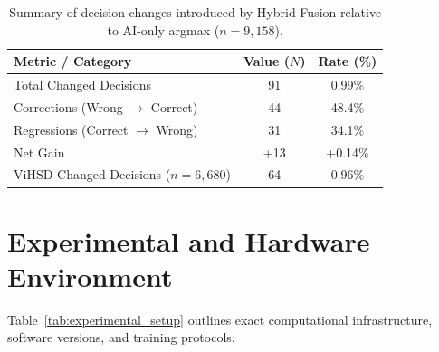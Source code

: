 \documentclass[runningheads]{llncs}
\begin{document}
\begin{table}[H]
\centering
\caption{Summary of decision changes introduced by Hybrid Fusion relative to AI-only argmax ($n=9{,}158$).}
\label{tab:change_analysis_full}
\begin{tabular}{lcc}
\toprule
Metric / Category & Value ($N$) & Rate (\%) \\
\midrule
Total Changed Decisions & 91 & 0.99\% \\
Corrections (Wrong $\to$ Correct) & 44 & 48.4\% \\
Regressions (Correct $\to$ Wrong) & 31 & 34.1\% \\
Net Gain & +13 & +0.14\% \\
\midrule
ViHSD Changed Decisions ($n=6{,}680$) & 64 & 0.96\% \\
\bottomrule
\end{tabular}
\end{table}

\section{Experimental and Hardware Environment}
Table~\ref{tab:experimental_setup} outlines exact computational infrastructure, software versions, and training protocols.

\begin{table}[H]
\centering
\caption{Summary of experimental hardware, software dependencies, and training protocol configuration.}
\label{tab:experimental_setup}
\scriptsize
\setlength{\tabcolsep}{2pt}
\end{table}
\end{document}
